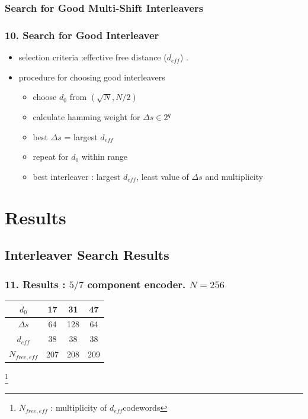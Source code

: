 \documentclass{beamer}  %
\newcommand\blfootnote[1]{%
  \begingroup
  \renewcommand\thefootnote{}\footnote{#1}%
  \addtocounter{footnote}{-1}%
  \endgroup
}
\begin{document}
\begin{frame}
\subsubsection{Search for Good Multi-Shift Interleavers }
\frametitle{10. Search for Good Interleaver}

\begin{itemize}
\setlength\itemsep{2em}
\item selection criteria :effective free distance ($d_{eff}$) .

\item procedure for choosing good interleavers

\begin{itemize}
\item choose $d_0$ from $(\sqrt{N},N/2)$

\item calculate hamming weight for  $\Delta s \in 2^q$



\item best $\Delta s$ = largest $d_{eff}$



\item repeat for $d_0$ within range 

\item best interleaver : largest $d_{eff}$, least value of $\Delta s$ and multiplicity
\end{itemize}



\end{itemize}

\end{frame}

\section{Results}
\subsection{Interleaver Search Results}
\begin{frame}
\frametitle{11. Results : $5/7$ component encoder. $N=256$}
\begin{table}[h!]
\centering
\begin{tabular}{||c |c |c |c||} 
 \hline
 $d_0$ & 17 & 31 & 47 \\ [0.5ex] 
 \hline\hline
 $\Delta s$ & 64 & 128 & 64 \\ 
 \hline
  $d_{eff}$ & 38 & 38 & 38 \\ 
  \hline
  $N_{free, eff}$ & 207 & 208 & 209 \\ [1ex] 
 \hline
\end{tabular}
\label{tab1}
\end{table}
\blfootnote{ $N_{free, eff}$ : multiplicity of $d_{eff} $codewords}
\end{frame}
\end{document}
